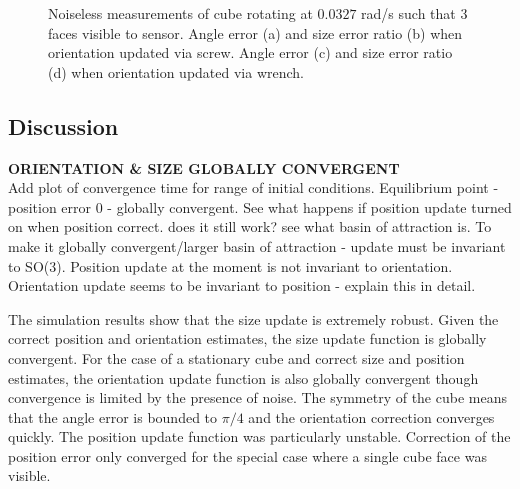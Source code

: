 \begin{figure}
{\begin{minipage}[b]{0.45\columnwidth}
 	\end{minipage}}
 	\caption{Noiseless measurements of cube rotating at $0.0327$ rad/s such that 3 faces visible to sensor. Angle error (a) and size error ratio (b) when orientation updated via screw. Angle error (c) and size error ratio (d) when orientation updated via wrench.}
 	\label{fig:orientation_size_rotating}
\end{figure}

\subsection{Discussion}

\textbf{ORIENTATION \& SIZE GLOBALLY CONVERGENT}\\
Add plot of convergence time for range of initial conditions. Equilibrium point - position error 0 - globally convergent. 
See what happens if position update turned on when position correct. does it still work? see what basin of attraction is.
To make it globally convergent/larger basin of attraction - update must be invariant to SO(3). Position update at the moment is not invariant to orientation.
Orientation update seems to be invariant to position - explain this in detail.

The simulation results show that the size update is extremely robust. Given the correct position and orientation estimates, the size update function is globally convergent.
For the case of a stationary cube and correct size and position estimates, the orientation update function is also globally convergent though convergence is limited by the presence of noise. The symmetry of the cube means that the angle error is bounded to $\pi/4$ and the orientation correction converges quickly. The position update function was particularly unstable. Correction of the position error only converged for the special case where a single cube face was visible. 

